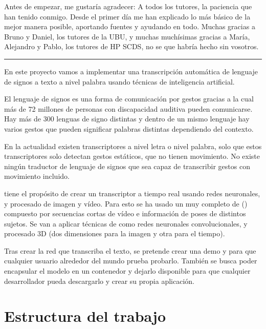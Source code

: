 
Antes de empezar, me gustaría agradecer:
A todos los tutores, la paciencia que han tenido conmigo. Desde el primer día me han explicado lo más básico de la mejor manera posible, aportando fuentes y ayudando en todo. Muchas
gracias a Bruno y Daniel, los tutores de la UBU, y muchas muchísimas
gracias a María, Alejandro y Pablo, los tutores de HP SCDS, no se que
habría hecho sin vosotros.

\noindent\rule{2cm}{0.4pt}

En este proyecto vamos a implementar una transcripción automática de lenguaje de signos a texto a nivel palabra usando técnicas de inteligencia artificial.

El lenguaje de signos es una forma de comunicación por gestos gracias a la cual más de 72 millones de personas con discapacidad auditiva pueden comunicarse. Hay más de 300 lenguas de signo distintas y dentro de un mismo lenguaje hay varios gestos que pueden significar palabras distintas dependiendo del contexto.

En la actualidad existen transcriptores a nivel letra o nivel palabra, solo que estos transcriptores solo detectan gestos estáticos, que no tienen movimiento. No existe ningún traductor de lenguaje de signos que sea capaz de transcribir gestos con movimiento incluido.

 tiene el propósito de crear un transcriptor a tiempo real usando redes neuronales,  y procesado de imagen y vídeo. Para esto se ha usado un  muy completo de  ()  compuesto por secuencias cortas de vídeo e información de poses de distintos sujetos. Se van a aplicar técnicas de  como redes neuronales convolucionales,  y procesado 3D (dos dimensiones para la imagen y otra para el tiempo).

Tras crear la red que transcriba el texto, se pretende crear una demo  y  para que cualquier usuario alrededor del mundo prueba probarlo. También se busca poder encapsular el modelo en un contenedor y dejarlo disponible para que cualquier desarrollador pueda descargarlo y crear su propia aplicación.

\section{Estructura del trabajo}

